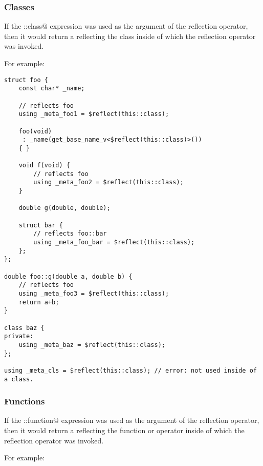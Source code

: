 \subsubsection{Classes}

If the \verb@this::class@ expression was used as the argument of the reflection
operator, then it would return a  reflecting the class
inside of which the reflection operator was invoked.

For example:

\begin{verbatim}
struct foo {
	const char* _name;

	// reflects foo
	using _meta_foo1 = $reflect(this::class);

	foo(void)
	 : _name(get_base_name_v<$reflect(this::class)>())
	{ }

	void f(void) {
		// reflects foo
		using _meta_foo2 = $reflect(this::class);
	}

	double g(double, double);

	struct bar {
		// reflects foo::bar
		using _meta_foo_bar = $reflect(this::class);
	};
};

double foo::g(double a, double b) {
	// reflects foo
	using _meta_foo3 = $reflect(this::class);
	return a+b;
}

class baz {
private:
	using _meta_baz = $reflect(this::class);
};

using _meta_cls = $reflect(this::class); // error: not used inside of a class.

\end{verbatim}

\subsubsection{Functions}

If the \verb@this::function@ expression was used as the argument of the reflection
operator, then it would return a  reflecting the function or operator
inside of which the reflection operator was invoked.

For example:

